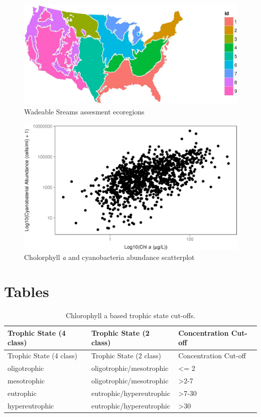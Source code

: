 \documentclass[12pt,]{article}
\begin{document}
\begin{figure}[htbp]
\centering
\includegraphics{manuscript_files/figure-latex/ecoregion_map-1.jpeg}
\caption{Wadeable Sreams assesment ecoregions \label{fig:ecoregion_map}}
\end{figure}

\newpage

\begin{figure}[htbp]
\centering
\includegraphics{manuscript_files/figure-latex/chla_cyano_scatterplot-1.jpeg}
\caption{Cholorphyll \emph{a} and cyanobacteria abundance
scatterplot\label{fig:scatterplot}}
\end{figure}

\newpage

\section{Tables}\label{tables}

\begin{longtable}[c]{@{}lll@{}}
\caption{Chlorophyll a based trophic state cut-offs.
\label{tab:trophicStateTable}}\tabularnewline
\toprule
Trophic State (4 class) & Trophic State (2 class) & Concentration
Cut-off\tabularnewline
\midrule
\endfirsthead
\toprule
Trophic State (4 class) & Trophic State (2 class) & Concentration
Cut-off\tabularnewline
\midrule
\endhead
oligotrophic & oligotrophic/mesotrophic & \textless{}= 2\tabularnewline
mesotrophic & oligotrophic/mesotrophic &
\textgreater{}2-7\tabularnewline
eutrophic & eutrophic/hypereutrophic & \textgreater{}7-30\tabularnewline
hypereutrophic & eutrophic/hypereutrophic &
\textgreater{}30\tabularnewline
\bottomrule
\end{longtable}
\end{document}
